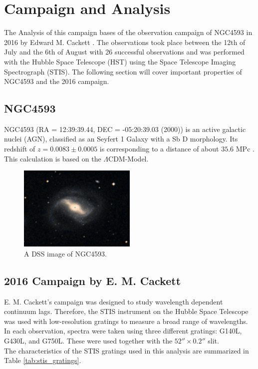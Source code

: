 \chapter{Campaign and Analysis}
\label{campaign_and_analysis}
The Analysis of this campaign bases of the observation campaign of NGC4593 in 2016 by Edward M. Cackett \cite{cackett2018accretion}. The observations took place between the 12th of July and the 6th of August with 26 successful observations and was performed with the Hubble Space Telescope (HST) using the Space Telescope Imaging Spectrograph (STIS). The following section will cover important properties of NGC4593 and the 2016 campaign.

\section{NGC4593}
\label{NGC4593}

NGC4593 (RA = 12:39:39.44, DEC = -05:20:39.03 (2000)) is an active galactic nuclei (AGN), classified as an Seyfert 1 Galaxy with a Sb D morphology. Its redshift of $ z = 0.0083 \pm 0.0005$ is corresponding to a distance of about $35.6$ MPc \cite{simbaNGC4593}. This calculation is based on the $\Lambda$CDM-Model. 

\begin{figure}[!ht]
	\centering
	\includegraphics[width=0.5\textwidth]{pictures/Chapter2/NGC4593.PNG}
	\caption{A DSS image of NGC4593.}
	\label{fig:NGC4593}
\end{figure}

\section{2016 Campaign by E. M. Cackett}
\label{Campaign_Cackett}

E. M. Cackett's campaign was designed to study wavelength dependent continuum lags. Therefore, the STIS instrument on the Hubble Space Telescope was used with low-resolution gratings to measure a broad range of wavelengths. In each observation, spectra were taken using three different gratings: G140L, G430L, and G750L. These were used together with the $52'' \times 0.2''$ slit.\\
The characteristics of the STIS gratings used in this analysis are summarized in Table \ref{tab:stis_gratings}.

